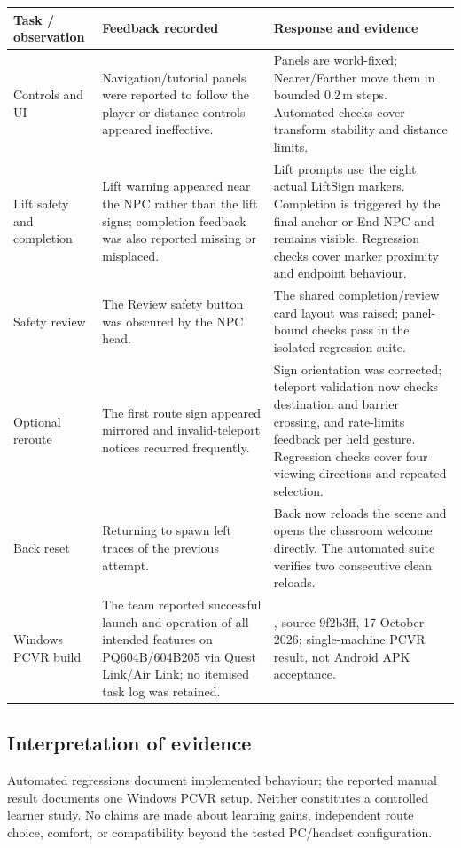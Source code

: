 \documentclass[12pt,a4paper]{article}
\newcommand{\code}[1]{\textnormal{#1}}
\begin{document}
\begin{tabularx}{\textwidth}{@{}p{2.35cm}YY@{}}
\toprule
\textbf{Task / observation} & \textbf{Feedback recorded} & \textbf{Response and evidence} \\
\midrule
Controls and UI &
Navigation/tutorial panels were reported to follow the player or distance
controls appeared ineffective. &
Panels are world-fixed; Nearer/Farther move them in bounded 0.2\,m steps.
Automated checks cover transform stability and distance limits. \\
Lift safety and completion &
Lift warning appeared near the NPC rather than the lift signs; completion
feedback was also reported missing or misplaced. &
Lift prompts use the eight actual LiftSign markers. Completion is triggered by
the final anchor or End NPC and remains visible. Regression checks cover
marker proximity and endpoint behaviour. \\
Safety review &
The Review safety button was obscured by the NPC head. &
The shared completion/review card layout was raised; panel-bound checks pass
in the isolated regression suite. \\
Optional reroute &
The first route sign appeared mirrored and invalid-teleport notices recurred
frequently. &
Sign orientation was corrected; teleport validation now checks destination
and barrier crossing, and rate-limits feedback per held gesture. Regression
checks cover four viewing directions and repeated selection. \\
Back reset &
Returning to spawn left traces of the previous attempt. &
Back now reloads the scene and opens the classroom welcome directly. The
automated suite verifies two consecutive clean reloads. \\
Windows PCVR build &
The team reported successful launch and operation of all intended features on
PQ604B/604B205 via Quest Link/Air Link; no itemised task log was retained. &
, source \code{9f2b3ff}, 17 October 2026;
single-machine PCVR result, not Android APK acceptance. \\
\bottomrule
\end{tabularx}

\subsection{Interpretation of evidence}
Automated regressions document implemented behaviour; the reported manual
result documents one Windows PCVR setup. Neither constitutes a controlled
learner study. No claims are made about learning gains, independent route
choice, comfort, or compatibility beyond the tested PC/headset configuration.
\end{document}
